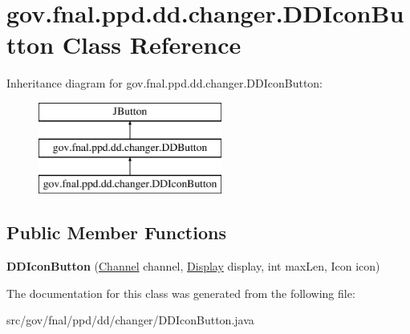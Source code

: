 \hypertarget{classgov_1_1fnal_1_1ppd_1_1dd_1_1changer_1_1DDIconButton}{\section{gov.\-fnal.\-ppd.\-dd.\-changer.\-D\-D\-Icon\-Button Class Reference}
\label{classgov_1_1fnal_1_1ppd_1_1dd_1_1changer_1_1DDIconButton}
}
Inheritance diagram for gov.\-fnal.\-ppd.\-dd.\-changer.\-D\-D\-Icon\-Button\-:\begin{figure}[H]
\begin{center}
\leavevmode
\includegraphics[height=3.000000cm]{classgov_1_1fnal_1_1ppd_1_1dd_1_1changer_1_1DDIconButton}
\end{center}
\end{figure}
\subsection*{Public Member Functions}
\begin{DoxyCompactItemize}
\item 
\hypertarget{classgov_1_1fnal_1_1ppd_1_1dd_1_1changer_1_1DDIconButton_a3ce3ff53b260e4cbbc984438c6b6d76a}{{\bfseries D\-D\-Icon\-Button} (\hyperlink{interfacegov_1_1fnal_1_1ppd_1_1dd_1_1signage_1_1Channel}{Channel} channel, \hyperlink{interfacegov_1_1fnal_1_1ppd_1_1dd_1_1signage_1_1Display}{Display} display, int max\-Len, Icon icon)}\label{classgov_1_1fnal_1_1ppd_1_1dd_1_1changer_1_1DDIconButton_a3ce3ff53b260e4cbbc984438c6b6d76a}

\end{DoxyCompactItemize}


The documentation for this class was generated from the following file\-:\begin{DoxyCompactItemize}
\item 
src/gov/fnal/ppd/dd/changer/D\-D\-Icon\-Button.\-java\end{DoxyCompactItemize}
